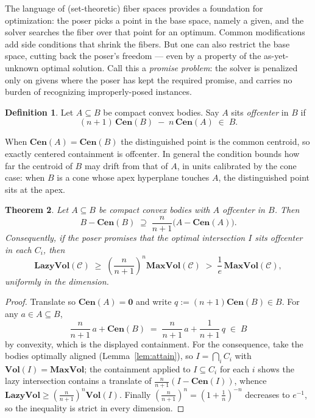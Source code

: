 \documentclass[12pt]{article}
\newtheorem{theorem}{Theorem}
\theoremstyle{definition}
\newtheorem{definition}[theorem]{Definition}
\newcommand{\Vol}{\mathbf{Vol}}
\newcommand{\Cen}{\mathbf{Cen}}
\newcommand{\MV}{\mathbf{MaxVol}}
\newcommand{\LV}{\mathbf{LazyVol}}
\begin{document}
The language of (set-theoretic) fiber spaces provides a foundation for
optimization: the poser picks a point in the base space, namely a given,
and the solver searches the fiber over that point for an optimum.
Common modifications add side conditions that shrink the fibers.  But
one can also restrict the base space, cutting back the poser's freedom
--- even by a property of the as-yet-unknown optimal solution.  Call
this a {\em promise problem}: the solver is penalized only on givens
where the poser has kept the required promise, and carries no burden of
recognizing improperly-posed instances.

\begin{definition}\label{def:offcenter}
Let $A\subseteq B$ be compact convex bodies.  Say $A$ sits {\em
offcenter} in $B$ if
\[
(n+1)\,\Cen(B)\;-\;n\,\Cen(A)\;\in\;B.
\]
\end{definition}

When $\Cen(A)=\Cen(B)$ the distinguished point is the common centroid,
so exactly centered containment is offcenter.  In general the condition
bounds how far the centroid of $B$ may drift from that of $A$, in units
calibrated by the cone case: when $B$ is a cone whose apex hyperplane
touches $A$, the distinguished point sits at the apex.

\begin{theorem}\label{thm:promise}
Let $A\subseteq B$ be compact convex bodies with $A$ offcenter in $B$.
Then
\[
B-\Cen(B)\;\supseteq\;\frac{n}{n+1}\bigl(A-\Cen(A)\bigr).
\]
Consequently, if the poser promises that the optimal intersection $I$
sits offcenter in each $C_i$, then
\[
\LV(\mathcal{C})\;\ge\;\left(\frac{n}{n+1}\right)^{\!n}\MV(\mathcal{C})
\;>\;\frac{1}{e}\,\MV(\mathcal{C}),
\]
uniformly in the dimension.
\end{theorem}

\begin{proof}
Translate so $\Cen(A)=\mathbf 0$ and write $q:=(n+1)\Cen(B)\in B$.  For
any $a\in A\subseteq B$,
\[
\frac{n}{n+1}\,a+\Cen(B)
\;=\;\frac{n}{n+1}\,a+\frac{1}{n+1}\,q\;\in\;B
\]
by convexity, which is the displayed containment.  For the consequence,
take the bodies optimally aligned (Lemma~\ref{lem:attain}), so
$I=\bigcap_iC_i$ with $\Vol(I)=\MV$; the containment applied to
$I\subseteq C_i$ for each $i$ shows the lazy intersection contains a
translate of $\frac{n}{n+1}(I-\Cen(I))$, whence
$\LV\ge\left(\frac{n}{n+1}\right)^n\Vol(I)$.  Finally
$\left(\frac{n}{n+1}\right)^n=\left(1+\frac1n\right)^{-n}$ decreases to
$e^{-1}$, so the inequality is strict in every dimension.
\end{proof}
\end{document}
